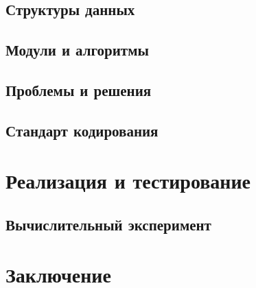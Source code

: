 \documentclass{fefu}
\begin{document}
  \subsection{Структуры данных}
  
  \subsection{Модули и алгоритмы}
  
  \subsection{Проблемы и решения}
  
  \subsection{Стандарт кодирования}
  

  \section{Реализация и тестирование}
  
  \subsection{Вычислительный эксперимент}
  

  \section*{Заключение}
  

  \newpage
  \nocite{*} %
  
  
\end{document}
